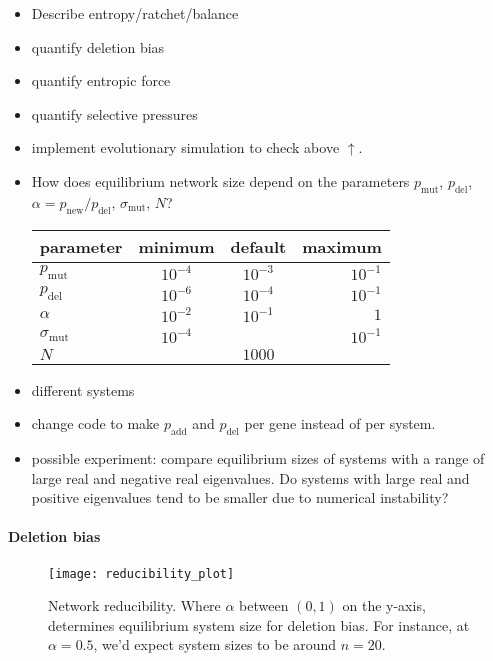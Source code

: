 \documentclass{article}
\begin{document}
\begin{itemize}
\item Describe entropy/ratchet/balance
\item quantify deletion bias
\item quantify entropic force
\item quantify selective pressures
\item implement evolutionary simulation to check above $\uparrow$. 
\item How does equilibrium network size depend on the parameters $p_{\text{mut}}$, $p_{\text{del}}$, $\alpha = p_{\text{new}}/p_{\text{del}}$, $\sigma_{\text{mut}}$, $N$?

\begin{tabular}{l | c | c | r}
\hline
parameter & minimum & default & maximum \\
\hline
$p_{\text{mut}}$ & $10^{-4}$ & $10^{-3}$ & $10^{-1}$ \\
\hline
$p_{\text{del}}$ & $10^{-6}$ & $10^{-4}$ & $10^{-1}$ \\
\hline
$\alpha$ & $10^{-2}$ & $10^{-1}$ & $1$ \\
\hline
$\sigma_{\text{mut}}$ & $10^{-4}$ & & $10^{-1}$ \\
\hline
$N$ & & $1000$ & \\
\hline
\end{tabular}

\item different systems

\item change code to make $p_{\text{add}}$ and $p_{\text{del}}$ per gene instead of per system. 

\item possible experiment: compare equilibrium sizes of systems with a range of large real and negative real eigenvalues. Do systems with large real and positive eigenvalues tend to be smaller due to numerical instability?
\end{itemize}

\paragraph{Deletion bias}

\begin{figure}[H]
\texttt{[image: reducibility\_plot]}
\caption{Network reducibility. Where $\alpha$ between $(0,1)$ on the y-axis, determines equilibrium system size for deletion bias. For instance, at $\alpha = 0.5$, we'd expect system sizes to be around $n=20$.}

\end{figure}
\end{document}
